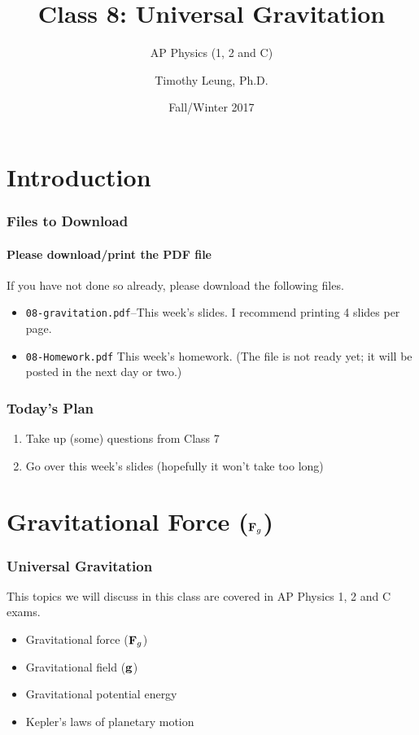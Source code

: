 \documentclass[12pt,compress,aspectratio=169]{beamer}
\title{Class 8: Universal Gravitation}
\subtitle{AP Physics (1, 2 and C)}
\author[TML]{Timothy Leung, Ph.D.}
\institute{Olympiads School}
\date{Fall/Winter 2017}
\newcommand{\mb}[1]{\ensuremath\mathbf{#1}}
\begin{document}
\begin{frame}
  \maketitle
\end{frame}


\section[Intro]{Introduction}

\begin{frame}
  \frametitle{Files to Download}
  \framesubtitle{Please download/print the PDF file}
  If you have not done so already, please download the following files.
  \begin{itemize}
  \item\texttt{08-gravitation.pdf}--This week's
    slides. I recommend printing 4 slides per page.
  \item\texttt{08-Homework.pdf} This week's homework. (The file is not ready
    yet; it will be posted in the next day or two.)
  \end{itemize}
\end{frame}


\begin{frame}
  \frametitle{Today's Plan}
  \begin{enumerate}
  \item Take up (some) questions from Class 7
  \item Go over this week's slides (hopefully it won't take too long)
  \end{enumerate}
\end{frame}



\section[$\mb{F}_g$]{Gravitational Force ($\mb{F}_g$)}
\begin{frame}
  \frametitle{Universal Gravitation}
  This topics we will discuss in this class are covered in AP Physics 1, 2 and
  C exams.
  \begin{itemize}
  \item Gravitational force ($\mb{F}_g$)
  \item Gravitational field ($\mb{g}$)
  \item Gravitational potential energy
  \item Kepler's laws of planetary motion
  \end{itemize}
\end{frame}
\end{document}
